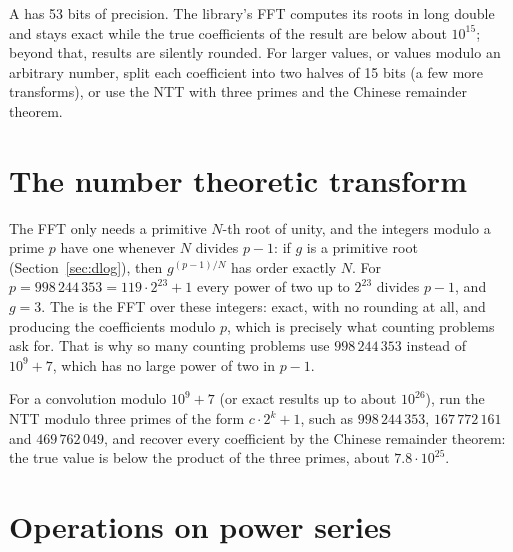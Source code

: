 \begin{pitfall}
A  has 53 bits of precision. The library's FFT computes its roots in long double and stays exact while the true
coefficients of the result are below about $10^{15}$; beyond that, results are silently rounded. For larger values, or values modulo an
arbitrary number, split each coefficient into two halves of 15 bits (a few more transforms), or use the NTT with three primes and the
Chinese remainder theorem.
\end{pitfall}

\section[The number theoretic transform]{The number theoretic transform \hfill \ioi}\label{sec:ntt}

The FFT only needs a primitive $N$-th root of unity, and the integers modulo a prime $p$ have one whenever $N$ divides $p - 1$: if $g$ is
a primitive root (Section~\ref{sec:dlog}), then $g^{(p-1)/N}$ has order exactly $N$. For $p = 998\,244\,353 = 119 \cdot 2^{23} + 1$
every power of two up to $2^{23}$ divides $p - 1$, and $g = 3$. The  is the FFT over these integers:
exact, with no rounding at all, and producing the coefficients modulo $p$, which is precisely what counting problems ask for. That is why
so many counting problems use $998\,244\,353$ instead of $10^9 + 7$, which has no large power of two in $p - 1$.

\begin{trick}
For a convolution modulo $10^9 + 7$ (or exact results up to about $10^{26}$), run the NTT modulo three primes of the form $c \cdot 2^k +
1$, such as $998\,244\,353$, $167\,772\,161$ and $469\,762\,049$, and recover every coefficient by the Chinese remainder theorem: the
true value is below the product of the three primes, about $7.8 \cdot 10^{25}$.
\end{trick}

\section[Operations on power series]{Operations on power series \hfill \ioi}\label{sec:polyops}

